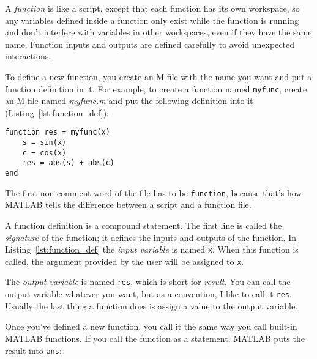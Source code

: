 A \emph{function} is like a script, except that each function has its own workspace, so any variables defined
inside a function only exist while the function is running and don't
interfere with variables in other workspaces, even if they have the
same name.
Function inputs and outputs are defined carefully to avoid
unexpected interactions.

To define a new function, you create an M-file with the name you
want and put a function definition in it.  For example, to create
a function named \lstinline{myfunc}, create an M-file named \emph{myfunc.m}
and put the following definition into it (Listing~\ref{lst:function_def}):


\begin{lstlisting}[caption={A function definition}, label={lst:function_def}]
function res = myfunc(x)
    s = sin(x)
    c = cos(x)
    res = abs(s) + abs(c)
end
\end{lstlisting}

The first non-comment word of the file has to be \lstinline{function}, because
that's how MATLAB tells the difference between a script and a function
file.


A function definition is a compound statement.  The first line
is called the \emph{signature} of the function; it defines
the inputs and outputs of the function.  In Listing~\ref{lst:function_def} the \emph{input variable} is named \lstinline{x}.  When this function is called, the
argument provided by the user will be assigned to \lstinline{x}.



The \emph{output variable} is named \lstinline{res}, which is short for
\emph{result}.  You can call the output variable whatever you want, but
as a convention, I like to call it \lstinline{res}.  Usually the last
thing a function does is assign a value to the output \mbox{variable}.


Once you've defined a new function, you call it the same way you
call built-in MATLAB functions.  If you call the function as a statement,
MATLAB puts the result into \lstinline{ans}:

